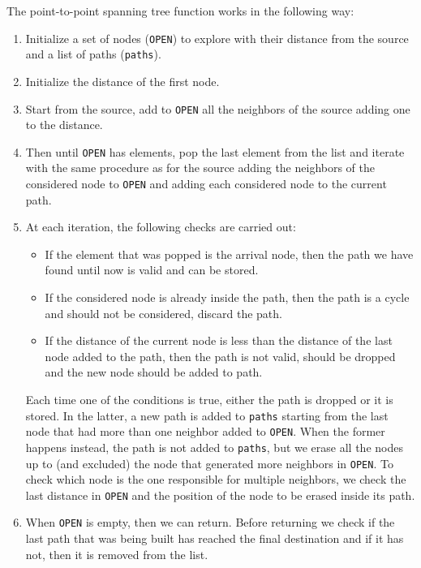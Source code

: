 The point-to-point spanning tree function  works in the
following way:
\begin{enumerate}
  \item Initialize a set of nodes (\texttt{OPEN}) to explore with their
    distance from the source and a list of paths (\texttt{paths}).
  \item Initialize the distance of the first node.
  \item Start from the source, add to \texttt{OPEN} all the neighbors of the 
    source adding one to the distance. 
  \item Then until \texttt{OPEN} has elements, pop the last element from the
    list and iterate with the same procedure as for the source adding the
    neighbors of the considered node to \texttt{OPEN} and adding each
    considered node to the current path. 
  \item At each iteration, the following checks are carried out:
    \begin{itemize}
      \item If the element that was popped is the arrival node, then the path
        we have found until now is valid and can be stored.
      \item If the considered node is already inside the path, then the path is
        a cycle and should not be considered, discard the path.
      \item If the distance of the current node is less than the distance of
        the last node added to the path, then the path is not valid, should be
        dropped and the new node should be added to path.
    \end{itemize}
    Each time one of the conditions is true, either the path is dropped or it
    is stored. In the latter, a new path is added to \texttt{paths} starting
    from the last node that had more than one neighbor added to \texttt{OPEN}.
    When the former happens instead, the path is not added to \texttt{paths},
    but we erase all the nodes up to (and excluded) the node that generated
    more neighbors in \texttt{OPEN}. To check which node is the one responsible
    for multiple neighbors, we check the last distance in \texttt{OPEN} and the
    position of the node to be erased inside its path. 
  \item When \texttt{OPEN} is empty, then we can return. Before returning we
    check if the last path that was being built has reached the final
    destination and if it has not, then it is removed from the list. 
\end{enumerate}

